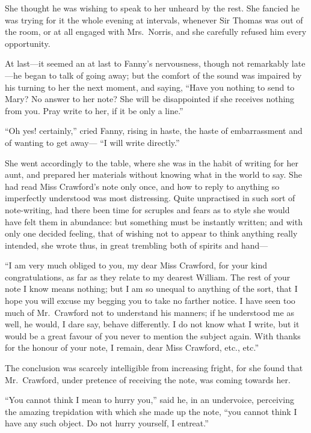 She thought he was wishing to speak to her unheard
by the rest.  She fancied he was trying for it the
whole evening at intervals, whenever Sir Thomas was
out of the room, or at all engaged with Mrs.\ Norris,
and she carefully refused him every opportunity.

At last---it seemed an at last to Fanny's nervousness,
though not remarkably late---he began to talk of going away;
but the comfort of the sound was impaired by his turning
to her the next moment, and saying, ``Have you nothing to send
to Mary?  No answer to her note?  She will be disappointed
if she receives nothing from you.  Pray write to her,
if it be only a line.''

``Oh yes! certainly,'' cried Fanny, rising in haste,
the haste of embarrassment and of wanting to get away---%
``I will write directly.''

She went accordingly to the table, where she was in the
habit of writing for her aunt, and prepared her materials
without knowing what in the world to say.  She had read
Miss Crawford's note only once, and how to reply to
anything so imperfectly understood was most distressing.
Quite unpractised in such sort of note-writing, had
there been time for scruples and fears as to style she
would have felt them in abundance:  but something must
be instantly written; and with only one decided feeling,
that of wishing not to appear to think anything really intended,
she wrote thus, in great trembling both of spirits and hand---%

``I am very much obliged to you, my dear Miss Crawford,
for your kind congratulations, as far as they relate to my
dearest William.  The rest of your note I know means nothing;
but I am so unequal to anything of the sort, that I hope
you will excuse my begging you to take no farther notice.
I have seen too much of Mr.\ Crawford not to understand
his manners; if he understood me as well, he would,
I dare say, behave differently.  I do not know what I write,
but it would be a great favour of you never to mention
the subject again.  With thanks for the honour of your note,
I remain, dear Miss Crawford, etc., etc.''

The conclusion was scarcely intelligible from increasing
fright, for she found that Mr.\ Crawford, under pretence
of receiving the note, was coming towards her.

``You cannot think I mean to hurry you,'' said he,
in an undervoice, perceiving the amazing trepidation
with which she made up the note, ``you cannot think
I have any such object.  Do not hurry yourself, I entreat.''

